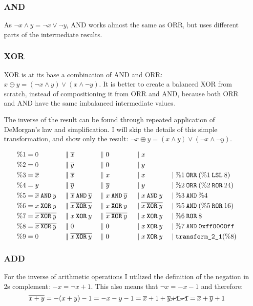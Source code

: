 \subsubsection{AND}
As $\neg{x \land y} = \neg{x} \lor \neg{y}$, AND works almost the same as ORR, but uses different parts of the intermediate results.

\subsubsection{XOR}
XOR is at its base a combination of AND and ORR: $x \oplus y = (\neg{x} \land y) \lor (x \land \neg{y})$.
It is better to create a balanced XOR from scratch, instead of compositioning it from ORR and AND, because both ORR and AND have the same imbalanced intermediate values.

The inverse of the result can be found through repeated application of DeMorgan's law and simplification.
I will skip the details of this simple transformation, and show only the result: $\neg{x \oplus y} = (x \land y) \lor (\neg{x} \land \neg{y})$.

\begin{align*}
  \binp{1}{0}{\neg{x}}{0}{x}\\
  \binp{2}{0}{\neg{y}}{0}{y}\\
  \btrans{3}{\neg{x}}{\neg{x}}{x}{x}{\%1 \borr (\%1 \blsl 8)}\\
  \btrans{4}{y}{\neg{y}}{\neg{y}}{y}{\%2 \borr (\%2 \bror 24)}\\
  \btrans{5}{\neg{x} \band y}{\neg{x} \band \neg{y}}{x \band \neg{y}}{x \band y}{\%3 \band \%4}\\
  \btrans{6}{x \bxor y}{\neg{x \bxor y}}{x \bxor y}{\neg{x \bxor y}}{\%5 \band (\%5 \bror 16)}\\
  \btrans{7}{\neg{x \bxor y}}{x \bxor y}{\neg{x \bxor y}}{x \bxor y}{\%6 \bror 8}\\
  \btrans{8}{\neg{x \bxor y}}{0}{0}{x \bxor y}{\%7 \band \hex{ff0000ff}}\\
  \btrans{9}{0}{\neg{x \bxor y}}{0}{x \bxor y}{\trans21 (\%8)}
\end{align*}

\subsubsection{ADD}
For the inverse of arithmetic operations I utilized the definition of the negation in 2s complement: $-x = \neg{x} + 1$.
This also means that $\neg{x} = -x - 1$ and therefore:
\begin{equation*}
  \neg{x + y} = - (x + y) - 1 = - x - y - 1 = \neg{x} + 1 + \neg{y} \cancel{+ 1} \cancel{- 1} = \neg{x} + \neg{y} + 1
\end{equation*}

